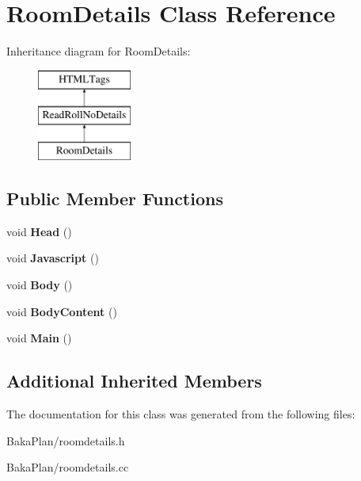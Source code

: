\hypertarget{classRoomDetails}{\section{Room\-Details Class Reference}
\label{classRoomDetails}
}
Inheritance diagram for Room\-Details\-:\begin{figure}[H]
\begin{center}
\leavevmode
\includegraphics[height=3.000000cm]{classRoomDetails}
\end{center}
\end{figure}
\subsection*{Public Member Functions}
\begin{DoxyCompactItemize}
\item 
\hypertarget{classRoomDetails_a12c87132fd36826fe2af9dbdb0b78e95}{void {\bfseries Head} ()}\label{classRoomDetails_a12c87132fd36826fe2af9dbdb0b78e95}

\item 
\hypertarget{classRoomDetails_aa88baea324517582b52f0e414744ea5d}{void {\bfseries Javascript} ()}\label{classRoomDetails_aa88baea324517582b52f0e414744ea5d}

\item 
\hypertarget{classRoomDetails_ad75c50cee05130e464714649ad640fa5}{void {\bfseries Body} ()}\label{classRoomDetails_ad75c50cee05130e464714649ad640fa5}

\item 
\hypertarget{classRoomDetails_ab440cfe52056a93720c2f6d82622510f}{void {\bfseries Body\-Content} ()}\label{classRoomDetails_ab440cfe52056a93720c2f6d82622510f}

\item 
\hypertarget{classRoomDetails_a5d3f194992c2c13c77d0d07e7d7d5bcd}{void {\bfseries Main} ()}\label{classRoomDetails_a5d3f194992c2c13c77d0d07e7d7d5bcd}

\end{DoxyCompactItemize}
\subsection*{Additional Inherited Members}


The documentation for this class was generated from the following files\-:\begin{DoxyCompactItemize}
\item 
Baka\-Plan/roomdetails.\-h\item 
Baka\-Plan/roomdetails.\-cc\end{DoxyCompactItemize}
